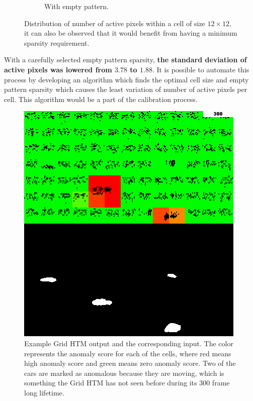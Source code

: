 \begin{figure}[H]
\begin{subfigure}[t]{0.5\textwidth}
        \caption{With empty pattern.}
        \label{fig:num_active_pixels_cell2}
    \end{subfigure}
    \caption{Distribution of number of active pixels within a cell of size $12\times 12$, it can also be observed that it would benefit from having a minimum sparsity requirement.}
    \label{fig:test}
\end{figure}


With a carefully selected empty pattern sparsity, \textbf{the standard deviation of active pixels was lowered from $\mathbf{3.78}$ to $\mathbf{1.88}$}. It is possible to automate this process by developing an algorithm which finds the optimal cell size and empty pattern sparsity which causes the least variation of number of active pixels per cell. This algorithm would be a part of the calibration process.
\begin{figure}[H]
    \centering
    \includegraphics[width=\textwidth]{resources/methodology/htm_grid_output.png}
    \caption{Example Grid HTM output and the corresponding input. The color represents the anomaly score for each of the cells, where red means high anomaly score and green means zero anomaly score. Two of the cars are marked as anomalous because they are moving, which is something the Grid HTM has not seen before during its 300 frame long lifetime.}
\end{figure}
